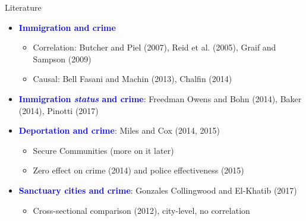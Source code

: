 \documentclass[xcolor=pdftex,dvipsnames,table]{beamer}
\begin{document}
\begin{frame}{Literature}
\begin{itemize}
\item \textbf{\textcolor{Blue}{Immigration and crime}}\vspace{0.10cm}
\begin{itemize}
\item Correlation: Butcher and Piel (2007), Reid et al. (2005), Graif and Sampson (2009)\vspace{0.10cm}
\item Causal: Bell Fasani and Machin (2013), Chalfin (2014)
\end{itemize}\vspace{0.20cm}
\item \textbf{\textcolor{Blue}{Immigration \textit{status} and crime}}: Freedman Owens and Bohn (2014), Baker (2014), Pinotti (2017)\vspace{0.20cm}
\item \textbf{\textcolor{Blue}{Deportation and crime}}: Miles and Cox (2014, 2015) \vspace{0.10cm}
\begin{itemize}
\item Secure Communities (more on it later) \vspace{0.10cm}
\item Zero effect on crime (2014) and police effectiveness (2015)
\end{itemize}\vspace{0.20cm}
\item \textbf{\textcolor{Blue}{Sanctuary cities and crime}}: Gonzales Collingwood and El-Khatib (2017) \vspace{0.10cm}
\begin{itemize}
\item Cross-sectional comparison (2012), city-level, no correlation
\end{itemize}
\end{itemize}
\end{frame}
\end{document}
